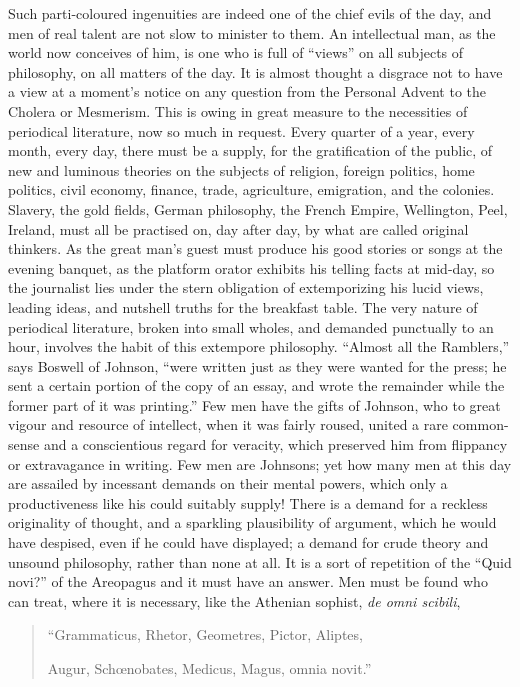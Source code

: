 Such parti-coloured ingenuities are indeed one of the chief evils of
the day, and men of real talent are not slow to minister to them. An
intellectual man, as the world now conceives of him, is one who is full
of ``views'' on all subjects of philosophy, on all matters of
the day. It is almost thought a disgrace not to have a view at a moment's
notice on any question from the Personal Advent to the Cholera or
Mesmerism. This is owing in great measure to the necessities of
periodical literature, now so much in request. Every quarter of a year,
every month, every day, there must be a supply, for the gratification of
the public, of new and luminous theories on the subjects of religion,
foreign politics, home politics, civil economy, finance, trade,
agriculture, emigration, and the colonies. Slavery, the gold fields,
German philosophy, the French Empire, Wellington, Peel, Ireland, must
all be practised on, day after day, by what are called original
thinkers. As the great man's guest must produce his good stories or
songs at the evening banquet, as the platform orator exhibits his
telling facts at mid-day, so the journalist lies under the stern
obligation of extemporizing his lucid views, leading ideas, and nutshell
truths for the breakfast table. The very nature of periodical
literature, broken into small wholes, and demanded punctually to an
hour, involves the habit of this extempore philosophy. ``Almost all
the Ramblers,'' says Boswell of Johnson, ``were written just as
they were wanted for the press; he sent a certain portion of the copy of
an essay, and wrote the remainder while the former part of it was
printing.'' Few men have the gifts of Johnson, who to great
vigour and resource of intellect, when it was fairly roused, united a
rare common-sense and a conscientious regard for veracity, which
preserved him from flippancy or extravagance in writing. Few men are
Johnsons; yet how many men at this day are assailed by incessant demands
on their mental powers, which only a productiveness like his could
suitably supply! There is a demand for a reckless originality of
thought, and a sparkling plausibility of argument, which he would have
despised, even if he could have displayed; a demand for crude theory and
unsound philosophy, rather than none at all. It is a sort of repetition
of the ``Quid novi?'' of the Areopagus and it must have an
answer. Men must be found who can treat, where it is necessary, like the
Athenian sophist, \emph{de omni scibili},

\begin{quote}

``Grammaticus, Rhetor, Geometres, Pictor, Aliptes,

Augur, Schœnobates, Medicus, Magus, omnia novit.''

\end{quote}

